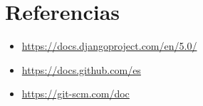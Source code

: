 \documentclass{article}
\begin{document}
	
  \newpage
  \section{Referencias}
  \begin{itemize}
    \item \url{https://docs.djangoproject.com/en/5.0/}
    \item \url{https://docs.github.com/es}
    \item \url{https://git-scm.com/doc}
  \end{itemize}
  
%
%
%
			
\end{document}

